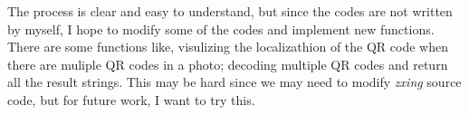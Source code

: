 \documentclass{article}
\begin{document}
The process is clear and easy to understand, but since the codes are not written by myself, I hope to modify some of the codes and implement new functions. There are some functions like, visulizing the localizathion of the QR code when there are muliple QR codes in a photo; decoding multiple QR codes and return all the result strings. This may be hard since we may need to modify \textit{zxing} source code, but for future work, I want to try this.
\end{document}
